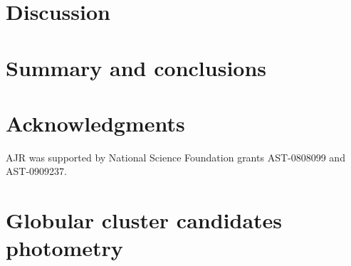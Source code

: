 \documentclass[useAMS,usenatbib]{mn2e}
\begin{document}
\section{Discussion}
\label{sec:discussion}

\lipsum[1-2]

\section{Summary and conclusions}
\label{sec:conclusions}

\lipsum[1-2]

\section*{Acknowledgments}

AJR was supported by National Science Foundation grants AST-0808099
and AST-0909237.




\appendix
\onecolumn
\section{Globular cluster candidates photometry}
\label{sec:appendix}



\lipsum[1]
\end{document}
